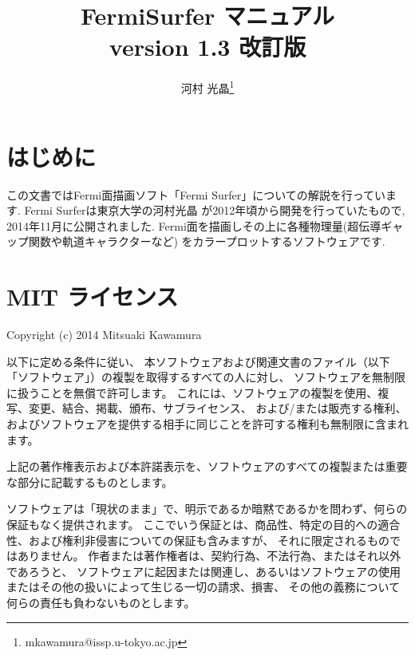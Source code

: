 \documentclass[12pt]{jarticle}
\begin{document}
%
%
\title{FermiSurfer マニュアル \\
version 1.3 改訂版}
\author{河村 光晶\footnote{mkawamura@issp.u-tokyo.ac.jp}}
\maketitle

\tableofcontents

\section{はじめに}

この文書ではFermi面描画ソフト「Fermi Surfer」についての解説を行っています. 
Fermi Surferは東京大学の河村光晶
が2012年頃から開発を行っていたもので, 
2014年11月に公開されました. 
Fermi面を描画しその上に各種物理量(超伝導ギャップ関数や軌道キャラクターなど)
をカラープロットするソフトウェアです. 

\section{MIT ライセンス}

Copyright (c) 2014 Mitsuaki Kawamura

\vspace{0.5cm}
以下に定める条件に従い、
本ソフトウェアおよび関連文書のファイル（以下「ソフトウェア」）の複製を取得するすべての人に対し、
ソフトウェアを無制限に扱うことを無償で許可します。
これには、ソフトウェアの複製を使用、複写、変更、結合、掲載、頒布、サブライセンス、
および/または販売する権利、およびソフトウェアを提供する相手に同じことを許可する権利も無制限に含まれます。

\vspace{0.5cm}
上記の著作権表示および本許諾表示を、ソフトウェアのすべての複製または重要な部分に記載するものとします。

\vspace{0.5cm}
ソフトウェアは「現状のまま」で、明示であるか暗黙であるかを問わず、何らの保証もなく提供されます。
ここでいう保証とは、商品性、特定の目的への適合性、および権利非侵害についての保証も含みますが、
それに限定されるものではありません。 作者または著作権者は、契約行為、不法行為、またはそれ以外であろうと、
ソフトウェアに起因または関連し、あるいはソフトウェアの使用またはその他の扱いによって生じる一切の請求、損害、
その他の義務について何らの責任も負わないものとします。 
\end{document}
